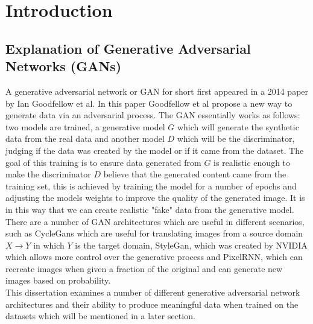 \chapter{Introduction}

\section{Explanation of Generative Adversarial Networks (GANs)}
A generative adversarial network or GAN for short first appeared in a 2014 paper by Ian Goodfellow et al\cite{generativeAdversarialNetworks}.  In this paper Goodfellow et al propose a new way to generate data via an adversarial process.  The GAN essentially works as follows: two models are trained, a generative model $G$ which will generate the synthetic data from the real data and another model $D$ which will be the discriminator, judging if the data was created by the model or if it came from the dataset.  The goal of this training is to ensure data generated from $G$ is realistic enough to make the discriminator $D$ believe that the generated content came from the training set, this is achieved by training the model for a number of epochs and adjusting the models weights to improve the quality of the generated image.  It  is in this way that we can create realistic "fake" data from the generative model.
\\
There are a number of GAN architectures which are useful in different scenarios, such as CycleGans\cite{cycleGan} which are useful for translating images from a source domain $X \rightarrow Y$ in which $Y$ is the target domain, StyleGan, which was created by NVIDIA which allows more control over the generative process\cite{styleGan} and PixelRNN, which can recreate images when given a fraction of the original and can generate new images based on probability\cite{pixelRnn}. 
\\
This dissertation examines a number of different generative adversarial network architectures and their ability to produce meaningful data when trained on the datasets which will be mentioned in a later section.
\vspace{0.5mm}
